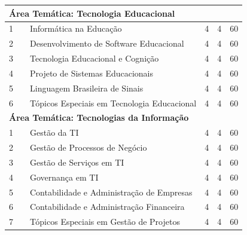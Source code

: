 \documentclass[
	12pt,				%
	openright,			%
  oneside,     %
	a4paper,			%
	english,			%
	french,				%
	spanish,			%
	brazil				%
	]{abntex2}
\begin{document}
\begin{apendicesenv}
\begin{longtable}{r|r|l|r|r|r}
\multicolumn{6}{l}{\textbf{Área Temática: Tecnologia Educacional}} \\ \hline
    1     &       & Informática na Educação & 4     & 4     & 60 \\ \hline
    2     &       & Desenvolvimento de Software Educacional & 4     & 4     & 60 \\ \hline
    3     &       & Tecnologia Educacional e Cognição & 4     & 4     & 60 \\ \hline
    4     &       & Projeto de Sistemas Educacionais & 4     & 4     & 60 \\ \hline
    5     &       & Linguagem Brasileira de Sinais & 4     & 4     & 60 \\ \hline
    6     &       & \small{Tópicos Especiais em Tecnologia Educacional} & 4     & 4     & 60 \\ \hline

\multicolumn{6}{l}{\textbf{Área Temática: Tecnologias da Informação}} \\ \hline
    1     &       & Gestão da TI & 4     & 4     & 60 \\ \hline
    2     &       & Gestão de Processos de Negócio & 4     & 4     & 60 \\ \hline
    3     &       & Gestão de Serviços em TI & 4     & 4     & 60 \\ \hline
    4     &       & Governança em TI & 4     & 4     & 60 \\ \hline
    5     &       & Contabilidade e Administração de Empresas & 4     & 4     & 60 \\ \hline
    6     &       & Contabilidade e Administração Financeira & 4     & 4     & 60 \\ \hline
    7     &       & \small{Tópicos Especiais em Gestão de Projetos} & 4     & 4     & 60 \\ \hline


    \end{longtable}%




\begin{landscape}


\end{landscape}
\end{apendicesenv}
\end{document}

